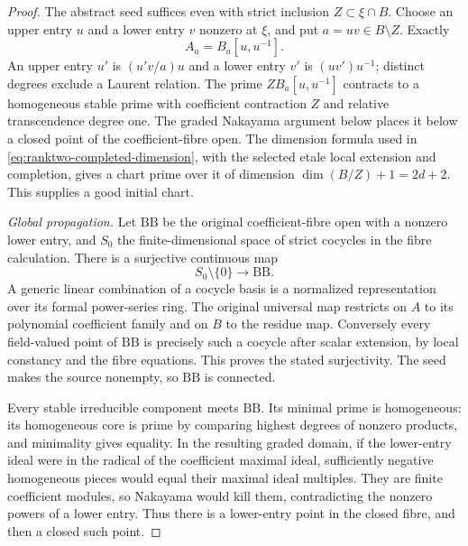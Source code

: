 \begin{proof}
The abstract seed suffices even with strict inclusion
$Z\subset\xi\cap B$.  Choose an upper entry $u$ and a lower entry
$v$ nonzero at $\xi$, and put $a=uv\in B\setminus Z$.  Exactly
\begin{equation}\label{eq:ranktwo-seed-localization}
                          A_a=B_a[u,u^{-1}].
\end{equation}
An upper entry $u'$ is $(u'v/a)u$ and a lower entry $v'$ is
$(uv')u^{-1}$; distinct degrees exclude a Laurent relation.
The prime $ZB_a[u,u^{-1}]$ contracts to a homogeneous stable prime
with coefficient contraction $Z$ and relative transcendence degree
one.  The graded Nakayama argument below places it below a closed
point of the coefficient-fibre open.  The dimension formula used
in \eqref{eq:ranktwo-completed-dimension}, with the selected etale
local extension and completion, gives a chart prime over it of
dimension $\dim(B/Z)+1=2d+2$.  This supplies a good initial chart.

\emph{Global propagation.}
Let $\mathrm{BB}$ be the original coefficient-fibre open with a
nonzero lower entry, and $S_0$ the finite-dimensional space of strict
cocycles in the fibre calculation.  There is a surjective continuous
map
\begin{equation}\label{eq:ranktwo-cocycle-fibre}
                         S_0\setminus\{0\}\longrightarrow\mathrm{BB}.
\end{equation}
A generic linear combination of a cocycle basis is a normalized
representation over its formal power-series ring.  The original
universal map restricts on $A$ to its polynomial coefficient family
and on $B$ to the residue map.  Conversely every field-valued point
of $\mathrm{BB}$ is precisely such a cocycle after scalar extension,
by local constancy and the fibre equations.  This proves the stated
surjectivity.  The seed makes the source nonempty, so $\mathrm{BB}$
is connected.

Every stable irreducible component meets $\mathrm{BB}$.  Its minimal
prime is homogeneous: its homogeneous core is prime by comparing
highest degrees of nonzero products, and minimality gives equality.
In the resulting graded domain, if the lower-entry ideal were in the
radical of the coefficient maximal ideal, sufficiently negative
homogeneous pieces would equal their maximal ideal multiples.
They are finite coefficient modules, so Nakayama would kill them,
contradicting the nonzero powers of a lower entry.  Thus there is a
lower-entry point in the closed fibre, and then a closed such point.


\end{proof}

